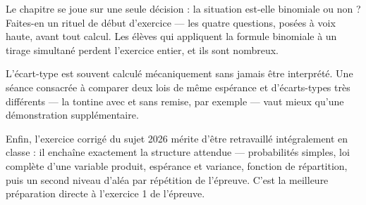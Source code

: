 \begin{notepourlaclasse}
Le chapitre se joue sur une seule décision : la situation est-elle binomiale
ou non ? Faites-en un rituel de début d'exercice — les quatre questions,
posées à voix haute, avant tout calcul. Les élèves qui appliquent la formule
binomiale à un tirage simultané perdent l'exercice entier, et ils sont
nombreux.

L'écart-type est souvent calculé mécaniquement sans jamais être interprété.
Une séance consacrée à comparer deux lois de même espérance et d'écarts-types
très différents — la tontine avec et sans remise, par exemple — vaut mieux
qu'une démonstration supplémentaire.

Enfin, l'exercice corrigé du sujet 2026 mérite d'être retravaillé intégralement
en classe : il enchaîne exactement la structure attendue — probabilités
simples, loi complète d'une variable produit, espérance et variance,
fonction de répartition, puis un second niveau d'aléa par répétition de
l'épreuve. C'est la meilleure préparation directe à l'exercice 1 de
l'épreuve.
\end{notepourlaclasse}
